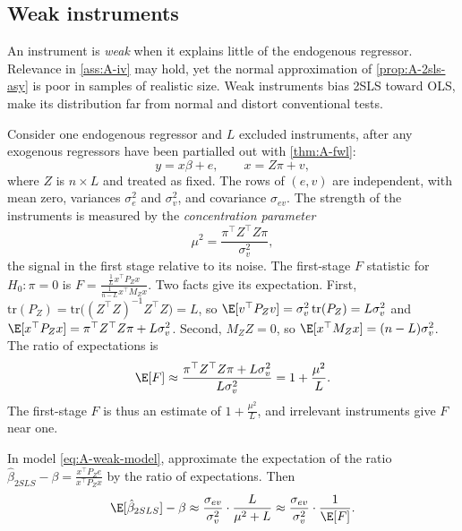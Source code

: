 \subsection{Weak instruments}\label{sec:A-weakiv}

An instrument is \emph{weak} when it explains little of the endogenous regressor. Relevance in \cref{ass:A-iv}
may hold, yet the normal approximation of \cref{prop:A-2sls-asy} is poor in samples of realistic size. Weak
instruments bias 2SLS toward OLS, make its distribution far from normal and distort conventional tests.

Consider one endogenous regressor and $L$ excluded instruments, after any exogenous regressors have been
partialled out with \cref{thm:A-fwl}:
\begin{equation}\label{eq:A-weak-model}
y = x\beta + e, \qquad x = Z\pi + v ,
\end{equation}
where $Z$ is $n \times L$ and treated as fixed. The rows of $(e, v)$ are independent, with mean zero, variances
$\sigma_e^2$ and $\sigma_v^2$, and covariance $\sigma_{ev}$. The strength of the instruments is measured by the
\emph{concentration parameter}
\begin{equation}\label{eq:A-mu2}
\mu^2 = \frac{\pi^\top Z^\top Z\pi}{\sigma_v^2} ,
\end{equation}
the signal in the first stage relative to its noise. The first-stage $F$ statistic for $H_0\colon\pi = 0$ is
$F = \frac{\frac{1}{L}x^\top P_Zx}{\frac{1}{n - L}x^\top M_Zx}$. Two facts give its expectation. First,
$\mathrm{tr}(P_Z) = \mathrm{tr}\bigl((Z^\top Z)^{-1}Z^\top Z\bigr) = L$, so
$\E[v^\top P_Zv] = \sigma_v^2\,\mathrm{tr}(P_Z) = L\sigma_v^2$ and
$\E[x^\top P_Zx] = \pi^\top Z^\top Z\pi + L\sigma_v^2$. Second, $M_ZZ = 0$, so $\E[x^\top M_Zx] = (n - L)\sigma_v^2$. The ratio
of expectations is
\begin{equation}\label{eq:A-EF}
\E[F] \approx \frac{\pi^\top Z^\top Z\pi + L\sigma_v^2}{L\sigma_v^2} = 1 + \frac{\mu^2}{L} .
\end{equation}
The first-stage $F$ is thus an estimate of $1 + \frac{\mu^2}{L}$, and irrelevant instruments give $F$ near one.

\begin{proposition}\label{prop:A-weak-bias}
In model \eqref{eq:A-weak-model}, approximate the expectation of the ratio
$\hat\beta_{2SLS} - \beta = \frac{x^\top P_Ze}{x^\top P_Zx}$ by the ratio of expectations. Then
\begin{equation}\label{eq:A-weak-bias}
\E[\hat\beta_{2SLS}] - \beta \approx \frac{\sigma_{ev}}{\sigma_v^2}\cdot\frac{L}{\mu^2 + L}
\approx \frac{\sigma_{ev}}{\sigma_v^2}\cdot\frac{1}{\E[F]} .
\end{equation}
\end{proposition}

